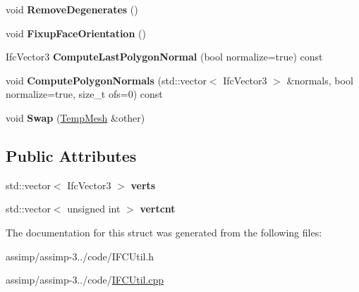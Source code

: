 \begin{DoxyCompactItemize}
\item 
\hypertarget{struct_assimp_1_1_i_f_c_1_1_temp_mesh_a18ba89277ede4b365ee9fa00fca81827}{void {\bfseries Remove\+Degenerates} ()}\label{struct_assimp_1_1_i_f_c_1_1_temp_mesh_a18ba89277ede4b365ee9fa00fca81827}

\item 
\hypertarget{struct_assimp_1_1_i_f_c_1_1_temp_mesh_a645b89c7a354789129913b8ba273fb7b}{void {\bfseries Fixup\+Face\+Orientation} ()}\label{struct_assimp_1_1_i_f_c_1_1_temp_mesh_a645b89c7a354789129913b8ba273fb7b}

\item 
\hypertarget{struct_assimp_1_1_i_f_c_1_1_temp_mesh_ad204b53a0542d6365981e5c306a09b25}{Ifc\+Vector3 {\bfseries Compute\+Last\+Polygon\+Normal} (bool normalize=true) const }\label{struct_assimp_1_1_i_f_c_1_1_temp_mesh_ad204b53a0542d6365981e5c306a09b25}

\item 
\hypertarget{struct_assimp_1_1_i_f_c_1_1_temp_mesh_a978a26b7e8b3b35c0a5044e85276eaa8}{void {\bfseries Compute\+Polygon\+Normals} (std\+::vector$<$ Ifc\+Vector3 $>$ \&normals, bool normalize=true, size\+\_\+t ofs=0) const }\label{struct_assimp_1_1_i_f_c_1_1_temp_mesh_a978a26b7e8b3b35c0a5044e85276eaa8}

\item 
\hypertarget{struct_assimp_1_1_i_f_c_1_1_temp_mesh_aa040d09b0b4a498089e99566e44c9b37}{void {\bfseries Swap} (\hyperlink{struct_assimp_1_1_i_f_c_1_1_temp_mesh}{Temp\+Mesh} \&other)}\label{struct_assimp_1_1_i_f_c_1_1_temp_mesh_aa040d09b0b4a498089e99566e44c9b37}

\end{DoxyCompactItemize}
\subsection*{Public Attributes}
\begin{DoxyCompactItemize}
\item 
\hypertarget{struct_assimp_1_1_i_f_c_1_1_temp_mesh_a1ce25a98fa20d32c7adc41e837c1b8cb}{std\+::vector$<$ Ifc\+Vector3 $>$ {\bfseries verts}}\label{struct_assimp_1_1_i_f_c_1_1_temp_mesh_a1ce25a98fa20d32c7adc41e837c1b8cb}

\item 
\hypertarget{struct_assimp_1_1_i_f_c_1_1_temp_mesh_ab8bd1214794a5aed2e8d2c97f22f3dcf}{std\+::vector$<$ unsigned int $>$ {\bfseries vertcnt}}\label{struct_assimp_1_1_i_f_c_1_1_temp_mesh_ab8bd1214794a5aed2e8d2c97f22f3dcf}

\end{DoxyCompactItemize}


The documentation for this struct was generated from the following files\+:\begin{DoxyCompactItemize}
\item 
assimp/assimp-\/3../code/I\+F\+C\+Util.\+h\item 
assimp/assimp-\/3../code/\hyperlink{_i_f_c_util_8cpp}{I\+F\+C\+Util.\+cpp}\end{DoxyCompactItemize}
